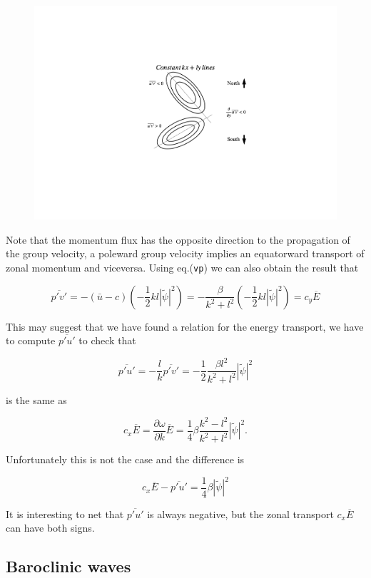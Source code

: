 \begin{figure}
\centering
\includegraphics[width =  \textwidth, keepaspectratio]{./figs/GD/BaroSlant.png}
\caption{}
\label{fig:}
\end{figure}

Note that the momentum flux has the opposite direction to the
propagation of the group velocity, a poleward group velocity implies an
equatorward transport of zonal momentum and viceversa. Using
eq.(\texttt{vp}) we can also obtain the result that

{\[\overline{p'v'} = -(\bar{u}-c) (-\frac{1}{2}kl|\tilde{\psi}|^2)= -\frac{\beta}{k^2+l^2}(-\frac{1}{2}kl|\tilde{\psi}|^2) = c_y \overline{E}\]}

This may suggest that we have found a relation for the energy transport,
we have to compute \(\overline{p'u'}\) to check that

\[\overline{p'u'} = -\frac{l}{k}\overline{p'v'}=-\frac{1}{2}\frac{\beta l^2}{k^2+l^2} |\tilde{\psi}|^2\]

is the same as

\[c_x \overline{E}= \frac{\partial \omega}{\partial k}\overline{E}= \frac{1}{4}\beta \frac{k^2-l^2}{k^2+l^2}|\tilde{\psi}|^2.\]

Unfortunately this is not the case and the difference is

\[c_x \overline{E}-\overline{p'u'} = \frac{1}{4}\beta|\tilde{\psi}|^2\]

It is interesting to net that \(\overline{p'u'}\) is always negative,
but the zonal transport \(c_x\overline{E}\) can have both signs.

\subsection{Baroclinic waves}\label{baroclinic-waves}

